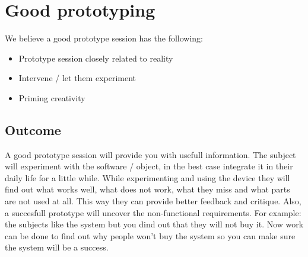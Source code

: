 \documentclass{article}
\begin{document}
\section{Good prototyping}
We believe a good prototype session has the following:

\begin{itemize}
\item Prototype session closely related to reality
\item Intervene / let them experiment
\item Priming creativity 
\end{itemize}
 
\subsection{Outcome}
A good prototype session will provide you with usefull information. The subject
will experiment with the software / object, in the best case integrate it in their
daily life for a little while. While experimenting and using the device they will
find out what works well, what does not work, what they miss and what parts
are not used at all. This way they can provide better feedback and critique.
Also, a succesfull prototype will uncover the non-functional requirements.
For example: the subjects like the system but you dind out that they will not
buy it. Now work can be done to find out why people won't buy the system so you can make sure the system will be a success.






\end{document}
